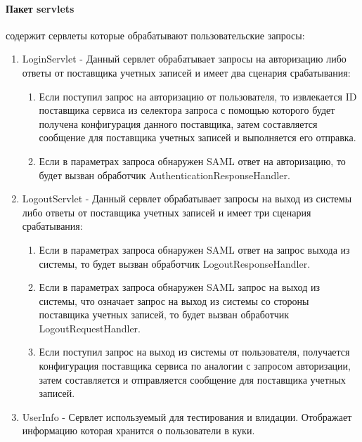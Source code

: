 \paragraph{Пакет servlets} содержит сервлеты которые обрабатывают пользовательские запросы:
\begin{enumerate}
\item LoginServlet - Данный сервлет обрабатывает запросы на авторизацию либо ответы от поставщика учетных записей и имеет два сценария срабатывания:
\begin{enumerate}
\item Если поступил запрос на авторизацию от пользователя, то извлекается ID поставщика сервиса из селектора запроса с помощью которого будет получена конфигурация данного поставщика, затем составляется сообщение для поставщика учетных записей и выполняется его отправка.
\item Если в параметрах запроса обнаружен SAML ответ на авторизацию, то будет вызван обработчик AuthenticationResponseHandler.
\end{enumerate}
\item LogoutServlet -  Данный сервлет обрабатывает запросы на выход из системы либо ответы от поставщика учетных записей и имеет три сценария срабатывания:
\begin{enumerate}
\item Если в параметрах запроса обнаружен SAML ответ на запрос выхода из системы, то будет вызван обработчик LogoutResponseHandler. 
\item Если в параметрах запроса обнаружен SAML запрос на выход из системы, что означает запрос на выход из системы со стороны поставщика учетных записей, то будет вызван обработчик LogoutRequestHandler. 
\item Если поступил запрос на выход из системы от пользователя, получается конфигурация поставщика сервиса по аналогии с запросом авторизации, затем составляется и отправляется сообщение для поставщика учетных записей.
\end{enumerate}
\item UserInfo - Сервлет используемый для тестирования и влидации. Отображает информацию которая хранится о пользователи в куки.
\end{enumerate}

